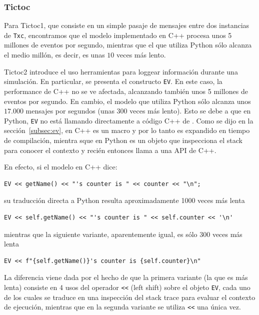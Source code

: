 \documentclass[]{article}
\begin{document}
\subsubsection{Tictoc}

Para Tictoc1, que consiste en un simple pasaje de mensajes entre dos instancias
de \verb!Txc!, encontramos que el modelo implementado en C++ procesa unos 5
millones de eventos por segundo, mientras que el que utiliza Python sólo
alcanza el medio millón, es decir, es unas $10$ veces más lento.

Tictoc2 introduce el uso herramientas para loggear información durante una
simulación. En particular, se presenta el constructo \verb!EV!.  En este caso,
la performance de C++ no se ve afectada, alcanzando también unos 5 millones de
eventos por segundo. En cambio, el modelo que utiliza Python sólo alcanza unos
$17.000$ mensajes por segundos (unas $300$ veces más lento). Esto se debe a que
en Python, \verb!EV! no está llamando directamente a código C++ de \omnetpp{}.
Como se dijo en la sección~\ref{subsec:ev}, en C++ es un macro y por lo tanto
es expandido en tiempo de compilación, mientra sque en Python es un objeto que
inspecciona el stack para conocer el contexto y recién entonces llama a una API
de C++.

En efecto, si el modelo en C++ dice:

\begin{verbatim}
EV << getName() << "'s counter is " << counter << "\n";
\end{verbatim}

\noindent su traducción directa a Python resulta aproximadamente 1000 veces más
lenta

\begin{verbatim}
EV << self.getName() << "'s counter is " << self.counter << '\n'
\end{verbatim}

\noindent mientras que la siguiente variante, aparentemente igual, es sólo 300
veces más lenta

\begin{verbatim}
EV << f"{self.getName()}'s counter is {self.counter}\n"
\end{verbatim}

La diferencia viene dada por el hecho de que la primera variante (la que es más
lenta) consiste en 4 usos del operador \verb!<<! (left shift) sobre el objeto
\verb!EV!, cada uno de los cuales se traduce en una inspección del stack trace
para evaluar el contexto de ejecución, mientras que en la segunda variante se
utiliza \verb!<<! una única vez.
\end{document}
